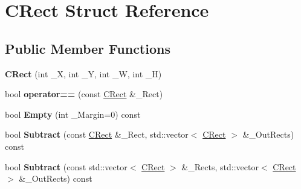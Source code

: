 \hypertarget{struct_c_rect}{\section{C\+Rect Struct Reference}
\label{struct_c_rect}
}
\subsection*{Public Member Functions}
\begin{DoxyCompactItemize}
\item 
\hypertarget{struct_c_rect_ab3d4c89f4ebac8c6154fabf71fe00cb7}{{\bfseries C\+Rect} (int \+\_\+\+X, int \+\_\+\+Y, int \+\_\+\+W, int \+\_\+\+H)}\label{struct_c_rect_ab3d4c89f4ebac8c6154fabf71fe00cb7}

\item 
\hypertarget{struct_c_rect_a081fb45736b0f4444a07855da38634c1}{bool {\bfseries operator==} (const \hyperlink{struct_c_rect}{C\+Rect} \&\+\_\+\+Rect)}\label{struct_c_rect_a081fb45736b0f4444a07855da38634c1}

\item 
\hypertarget{struct_c_rect_a29f1825b010f168cf3a5ab2cff510557}{bool {\bfseries Empty} (int \+\_\+\+Margin=0) const }\label{struct_c_rect_a29f1825b010f168cf3a5ab2cff510557}

\item 
\hypertarget{struct_c_rect_acf1419cf7d7ab99aa4a9867c485bc992}{bool {\bfseries Subtract} (const \hyperlink{struct_c_rect}{C\+Rect} \&\+\_\+\+Rect, std\+::vector$<$ \hyperlink{struct_c_rect}{C\+Rect} $>$ \&\+\_\+\+Out\+Rects) const }\label{struct_c_rect_acf1419cf7d7ab99aa4a9867c485bc992}

\item 
\hypertarget{struct_c_rect_a28045c2c2efb54969086f4426ac681c0}{bool {\bfseries Subtract} (const std\+::vector$<$ \hyperlink{struct_c_rect}{C\+Rect} $>$ \&\+\_\+\+Rects, std\+::vector$<$ \hyperlink{struct_c_rect}{C\+Rect} $>$ \&\+\_\+\+Out\+Rects) const }\label{struct_c_rect_a28045c2c2efb54969086f4426ac681c0}

\end{DoxyCompactItemize}
